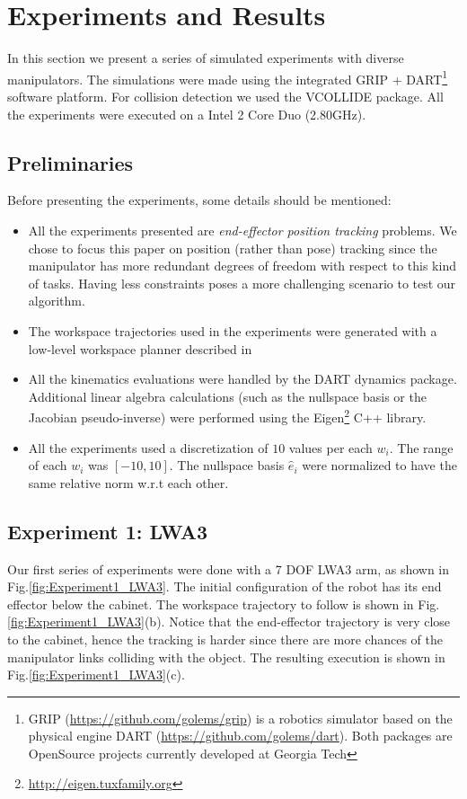 \documentclass[conference]{IEEEtran}
\newcommand{\nsb}{\ensuremath{\hat{e}}} %
\newcommand{\nsc}{\ensuremath{w}}  %
\begin{document}
\section{Experiments and Results}
\label{sec:Experiments}
In this section we present a series of simulated experiments
with diverse manipulators. The simulations were made using the
integrated GRIP + DART\footnote{ GRIP (\url{https://github.com/golems/grip})
is a robotics simulator based on the physical engine DART (\url{https://github.com/golems/dart}).
Both packages are OpenSource projects currently developed at Georgia Tech} 
software platform. For collision detection we used the VCOLLIDE package\cite{Hudson97v-collide:accelerated}. All the experiments were
executed on a Intel 2 Core Duo (2.80GHz).

\subsection{Preliminaries}
Before presenting the experiments, some details should be mentioned:

\begin{itemize}
\item{All the experiments presented are \textit{end-effector position
tracking} problems. We chose to focus this paper on
position (rather than pose) tracking since the manipulator
has more redundant degrees of freedom with respect to
this kind of tasks. Having less constraints poses a more
challenging scenario to test our algorithm.}
\item{The workspace trajectories used in the experiments were generated
with a low-level workspace planner described in \cite{achq-wsp-2012}}
\item{All the kinematics evaluations were handled by the DART dynamics package. Additional linear algebra calculations (such as the nullspace basis or the Jacobian pseudo-inverse) were performed using the Eigen\footnote{\url{http://eigen.tuxfamily.org}} C++ library.}
\item{All the experiments used a discretization of $10$ values per each $\nsc_{i}$. The range of each $\nsc_{i}$ was $[-10,10]$. The nullspace basis $\nsb_{i}$ were normalized to have the same relative norm w.r.t each other.}
\end{itemize}

\subsection{Experiment 1: LWA3}
Our first series of experiments were done with a 7 DOF
LWA3 arm, as shown in Fig.\ref{fig:Experiment1_LWA3}. The initial configuration of the
robot has its end effector below the cabinet. The workspace
trajectory to follow is shown in Fig.\ref{fig:Experiment1_LWA3}(b). Notice that the
end-effector trajectory is very close to the cabinet, hence the
tracking is harder since there are more chances of the manipulator
links colliding with the object. The resulting execution is
shown in Fig.\ref{fig:Experiment1_LWA3}(c).
\end{document}
